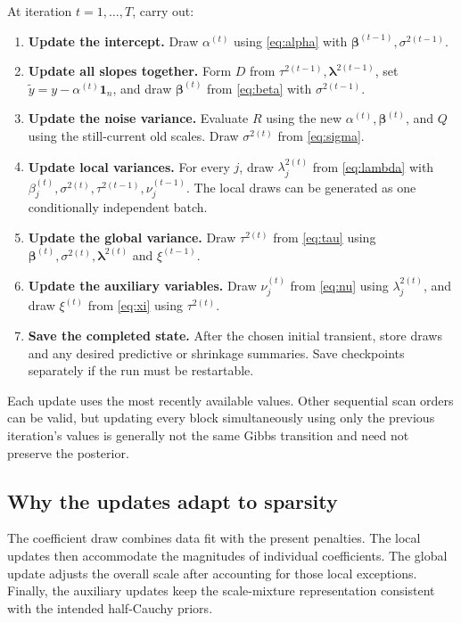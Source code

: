 \documentclass[11pt,letterpaper]{article}
\numberwithin{equation}{section}
\newcommand{\bbeta}{\bm{\beta}}
\newcommand{\blambda}{\bm{\lambda}}
\newcommand{\ones}{\mathbf{1}}
\begin{document}
At iteration \(t=1,\ldots,T\), carry out:
\begin{enumerate}[label=\textbf{\arabic*.},leftmargin=*]
\item \textbf{Update the intercept.} Draw \(\alpha^{(t)}\) using
\eqref{eq:alpha} with \(\bbeta^{(t-1)},\sigma^{2(t-1)}\).

\item \textbf{Update all slopes together.} Form \(D\) from
\(\tau^{2(t-1)},\blambda^{2(t-1)}\), set
\(\widetilde y=y-\alpha^{(t)}\ones_n\), and draw \(\bbeta^{(t)}\)
from \eqref{eq:beta} with \(\sigma^{2(t-1)}\).

\item \textbf{Update the noise variance.} Evaluate \(R\) using the new
\(\alpha^{(t)},\bbeta^{(t)}\), and \(Q\) using the still-current old scales.
Draw \(\sigma^{2(t)}\) from \eqref{eq:sigma}.

\item \textbf{Update local variances.} For every \(j\), draw
\(\lambda_j^{2(t)}\) from \eqref{eq:lambda} with
\(\beta_j^{(t)},\sigma^{2(t)},\tau^{2(t-1)},\nu_j^{(t-1)}\).
The local draws can be generated as one conditionally independent batch.

\item \textbf{Update the global variance.} Draw \(\tau^{2(t)}\) from
\eqref{eq:tau} using \(\bbeta^{(t)},\sigma^{2(t)},\blambda^{2(t)}\)
and \(\xi^{(t-1)}\).

\item \textbf{Update the auxiliary variables.} Draw \(\nu_j^{(t)}\)
from \eqref{eq:nu} using \(\lambda_j^{2(t)}\), and draw \(\xi^{(t)}\)
from \eqref{eq:xi} using \(\tau^{2(t)}\).

\item \textbf{Save the completed state.} After the chosen initial transient,
store draws and any desired predictive or shrinkage summaries. Save
checkpoints separately if the run must be restartable.
\end{enumerate}
Each update uses the most recently available values. Other sequential scan
orders can be valid, but updating every block simultaneously using only the
previous iteration's values is generally not the same Gibbs transition and
need not preserve the posterior.

\subsection{Why the updates adapt to sparsity}

The coefficient draw combines data fit with the present penalties. The local
updates then accommodate the magnitudes of individual coefficients. The
global update adjusts the overall scale after accounting for those local
exceptions. Finally, the auxiliary updates keep the scale-mixture
representation consistent with the intended half-Cauchy priors.
\end{document}

